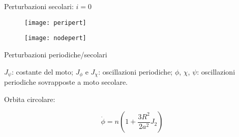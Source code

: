 \begin{frame}{Perturbazioni secolari: $i=0$}

\begin{figure}[!ht]\texttt{[image: peripert]}\end{figure}

\begin{figure}[!ht]\texttt{[image: nodepert]}\end{figure}

\end{frame}


\begin{wordonframe}{Perturbazioni periodiche/secolari}

$J_{\psi}$: costante del moto; $J_{\phi}$ e $J_{\chi}$: oscillazioni periodiche; $\phi$, $\chi$, $\psi$: oscillazioni periodiche sovrapposte a moto secolare. 

Orbita circolare:

\begin{equation*}
\dot{\phi}=n(1+\frac{3R^2}{2a^2}J_2)
\end{equation*}


\end{wordonframe}

